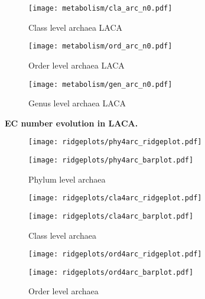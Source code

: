 \begin{figure}[H]
    \centering
    \texttt{[image: metabolism/cla\_arc\_n0.pdf]}
    \caption{Class level archaea LACA}
    \label{cla4arc_metnet}
\end{figure}   

\begin{figure}[H]
    \centering
    \texttt{[image: metabolism/ord\_arc\_n0.pdf]}
    \caption{Order level archaea LACA}
    \label{ord4arc_metnet}
\end{figure}   

\begin{figure}[H]
    \centering
    \texttt{[image: metabolism/gen\_arc\_n0.pdf]}
    \caption{Genus level archaea LACA}
    \label{gen4arc_metnet}
\end{figure}   

\textbf{EC number evolution in LACA.}
\begin{figure}[H]
    \centering
    \texttt{[image: ridgeplots/phy4arc\_ridgeplot.pdf]}
    \label{ridgeplot_phy4arc}
\end{figure}

\begin{figure}[H]
    \centering
    \texttt{[image: ridgeplots/phy4arc\_barplot.pdf]}
    \caption[]{Phylum level archaea}
    \label{barplot_phy4arc}
\end{figure}

\begin{figure}[H]
    \centering
    \texttt{[image: ridgeplots/cla4arc\_ridgeplot.pdf]}
    \label{ridgeplot_cla4arc}
\end{figure}

\begin{figure}[H]
    \centering
    \texttt{[image: ridgeplots/cla4arc\_barplot.pdf]}
    \caption[]{Class level archaea}
    \label{barplot_cla4arc}
\end{figure}

\begin{figure}[H]
    \centering
    \texttt{[image: ridgeplots/ord4arc\_ridgeplot.pdf]}
    \label{ridgeplot_ord4arc}
\end{figure}

\begin{figure}[H]
    \centering
    \texttt{[image: ridgeplots/ord4arc\_barplot.pdf]}
    \caption[]{Order level archaea}
    \label{barplot_ord4arc}
\end{figure}

